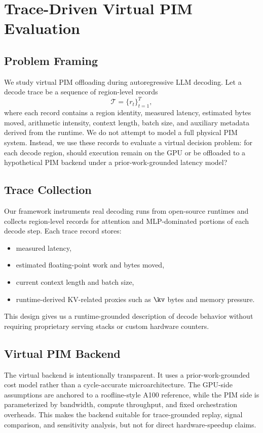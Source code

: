 \section{Trace-Driven Virtual PIM Evaluation}
\label{sec:method}

\subsection{Problem Framing}

We study virtual PIM offloading during autoregressive LLM decoding. Let a decode trace be a sequence of region-level records
\[
\mathcal{T} = \{r_t\}_{t=1}^{T},
\]
where each record contains a region identity, measured latency, estimated bytes moved, arithmetic intensity, context length, batch size, and auxiliary metadata derived from the runtime. We do not attempt to model a full physical PIM system. Instead, we use these records to evaluate a virtual decision problem: for each decode region, should execution remain on the GPU or be offloaded to a hypothetical PIM backend under a prior-work-grounded latency model?

\subsection{Trace Collection}

Our framework instruments real decoding runs from open-source runtimes and collects region-level records for attention and MLP-dominated portions of each decode step. Each trace record stores:
\begin{itemize}
\item measured latency,
\item estimated floating-point work and bytes moved,
\item current context length and batch size,
\item runtime-derived KV-related proxies such as $\kv$ bytes and memory pressure.
\end{itemize}
This design gives us a runtime-grounded description of decode behavior without requiring proprietary serving stacks or custom hardware counters.

\subsection{Virtual PIM Backend}

The virtual backend is intentionally transparent. It uses a prior-work-grounded cost model rather than a cycle-accurate microarchitecture. The GPU-side assumptions are anchored to a roofline-style A100 reference, while the PIM side is parameterized by bandwidth, compute throughput, and fixed orchestration overheads. This makes the backend suitable for trace-grounded replay, signal comparison, and sensitivity analysis, but not for direct hardware-speedup claims.

